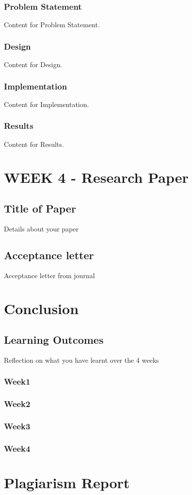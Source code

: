 \subsection{Problem Statement}
Content for Problem Statement.
\subsection{Design}
Content for Design.
\subsection{Implementation}
Content for Implementation.
\subsection{Results}
Content for Results.

\chapter{WEEK 4 - Research Paper}
\section{Title of Paper}
Details about your paper
\section{Acceptance letter}
Acceptance letter from journal

\chapter{Conclusion}
\section{Learning Outcomes}
Reflection on what you have learnt over the 4 weeks
\subsection{Week1}
\subsection{Week2}
\subsection{Week3}
\subsection{Week4}

\chapter{Plagiarism Report}